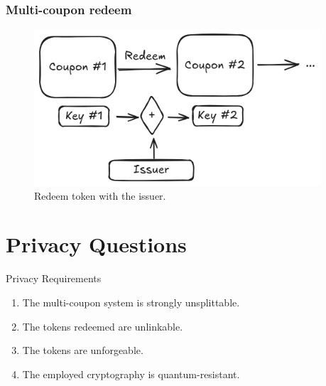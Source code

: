\documentclass[presentation]{beamer}
\begin{document}
\begin{frame}
  \frametitle{Multi-coupon redeem}
  \begin{figure}
    \begin{center}
      \includegraphics[width=0.95\textwidth]{redeem-token}
    \end{center}
    \caption{Redeem token with the issuer.}\label{fig:redeem-token}
  \end{figure}
\end{frame}

\section{Privacy Questions}
\begin{frame}{Privacy Requirements}
  \begin{enumerate}
    \item The multi-coupon system is \alert{strongly unsplittable}.
      \pause
    \item The tokens redeemed are \alert{unlinkable}.
      \pause
    \item The tokens are \alert{unforgeable}.
      \pause
    \item The employed cryptography is \alert{quantum-resistant}.
  \end{enumerate}
\end{frame}
\end{document}
